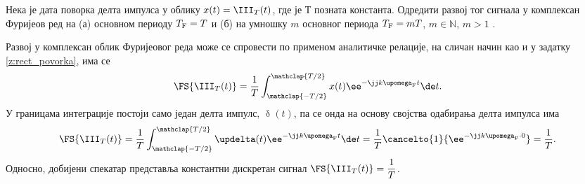 \PID 
Нека је дата поворка делта импулса у облику $x(t) = \III_T(t)$, где је $Т$ позната константа. 
Одредити развој тог сигнала у комплексан Фуријеов ред 
на (а) основном периоду $T_{\rm F} = T$  и (б) на умношку $m$ основног периода $T_{\rm F} = mT$, $m \in \mathbb N$, $m > 1$ .

\RESENJE
Развој у комплексан облик Фуријеовог реда  може се спровести по применом аналитичке релације, на сличан начин као и у 
задатку \ref{z:rect_povorka}, има се 
\begin{eqnarray}
    \FS{\III_{T}(t)} = \dfrac{1}{T} 
    \int_{\mathclap{-T/2}}^{\mathclap{T/2}} x(t) \ee^{-\jj k \upomega_{\rm F} t} \de t. \label{\ID.e1}
\end{eqnarray}
У границама интеграције постоји само један делта импулс, $\updelta(t)$, па се онда на основу 
својства одабирања делта импулса има 
\begin{eqnarray}
    \FS{\III_{T}(t)} = \dfrac{1}{T} 
    \int_{\mathclap{-T/2}}^{\mathclap{T/2}} \updelta(t) \ee^{-\jj k \upomega_{\rm F} t} \de t = 
     \dfrac{1}{T} \cancelto{1}{\ee^{-\jj k \upomega_{\rm F} \cdot 0}} = \dfrac{1}{T}.
\end{eqnarray}
Односно, добијени спекатар представља константни дискретан сигнал $\FS{\III_{T}(t)} = \dfrac{1}{T}$. 

